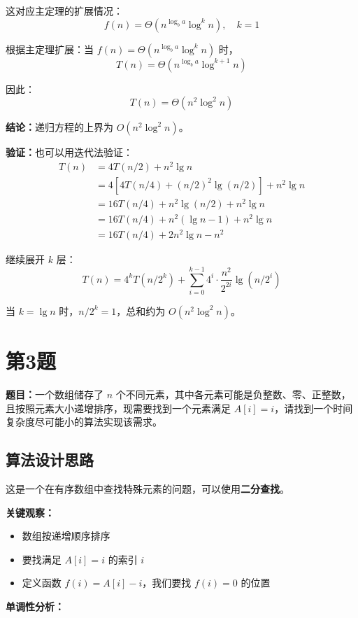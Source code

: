 \documentclass[UTF8,12pt,a4paper]{ctexart}
\begin{document}
这对应主定理的扩展情况：
$$f(n) = \Theta(n^{\log_b a} \log^k n), \quad k = 1$$

根据主定理扩展：当 $f(n) = \Theta(n^{\log_b a} \log^k n)$ 时，
$$T(n) = \Theta(n^{\log_b a} \log^{k+1} n)$$

因此：
$$T(n) = \Theta(n^2 \log^2 n)$$

\textbf{结论：}递归方程的上界为 $O(n^2 \log^2 n)$。

\textbf{验证：}也可以用迭代法验证：
\begin{align*}
T(n) &= 4T(n/2) + n^2 \lg n \\
&= 4[4T(n/4) + (n/2)^2 \lg(n/2)] + n^2 \lg n \\
&= 16T(n/4) + n^2 \lg(n/2) + n^2 \lg n \\
&= 16T(n/4) + n^2(\lg n - 1) + n^2 \lg n \\
&= 16T(n/4) + 2n^2 \lg n - n^2
\end{align*}

继续展开 $k$ 层：
$$T(n) = 4^k T(n/2^k) + \sum_{i=0}^{k-1} 4^i \cdot \frac{n^2}{2^{2i}} \lg(n/2^i)$$

当 $k = \lg n$ 时，$n/2^k = 1$，总和约为 $O(n^2 \log^2 n)$。


\section*{第3题}
\textbf{题目：}一个数组储存了 $n$ 个不同元素，其中各元素可能是负整数、零、正整数，且按照元素大小递增排序，现需要找到一个元素满足 $A[i] = i$，请找到一个时间复杂度尽可能小的算法实现该需求。

\subsection*{算法设计思路}

这是一个在有序数组中查找特殊元素的问题，可以使用\textbf{二分查找}。

\textbf{关键观察：}
\begin{itemize}
	\item 数组按递增顺序排序
	\item 要找满足 $A[i] = i$ 的索引 $i$
	\item 定义函数 $f(i) = A[i] - i$，我们要找 $f(i) = 0$ 的位置
\end{itemize}

\textbf{单调性分析：}
\end{document}
